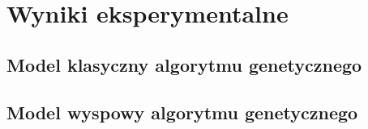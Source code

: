 \chapter{Wyniki eksperymentalne}
\thispagestyle{chapterBeginStyle}


\section{Model klasyczny algorytmu genetycznego}

\section{Model wyspowy algorytmu genetycznego}
